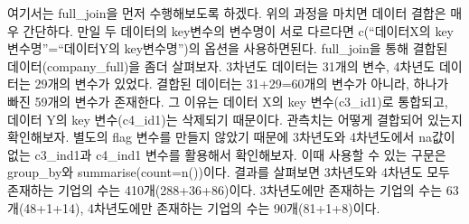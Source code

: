 \documentclass[
]{book}
\theoremstyle{definition}
\theoremstyle{definition}
\theoremstyle{definition}
\theoremstyle{definition}
\theoremstyle{remark}
\begin{document}
여기서는 full\_join을 먼저 수행해보도록 하겠다. 위의 과정을 마치면 데이터 결합은 매우 간단하다. 만일 두 데이터의 key변수의 변수명이 서로 다르다면 c(``데이터X의 key변수명''=``데이터Y의 key변수명'')의 옵션을 사용하면된다. full\_join을 통해 결합된 데이터(company\_full)을 좀더 살펴보자. 3차년도 데이터는 31개의 변수, 4차년도 데이터는 29개의 변수가 있었다. 결합된 데이터는 31+29=60개의 변수가 아니라, 하나가 빠진 59개의 변수가 존재한다. 그 이유는 데이터 X의 key 변수(c3\_id1)로 통합되고, 데이터 Y의 key 변수(c4\_id1)는 삭제되기 때문이다. 관측치는 어떻게 결합되어 있는지 확인해보자. 별도의 flag 변수를 만들지 않았기 때문에 3차년도와 4차년도에서 na값이 없는 c3\_ind1과 c4\_ind1 변수를 활용해서 확인해보자. 이때 사용할 수 있는 구문은 group\_by와 summarise(count=n())이다. 결과를 살펴보면 3차년도와 4차년도 모두 존재하는 기업의 수는 410개(288+36+86)이다. 3차년도에만 존재하는 기업의 수는 63개(48+1+14), 4차년도에만 존재하는 기업의 수는 90개(81+1+8)이다.
\end{document}
